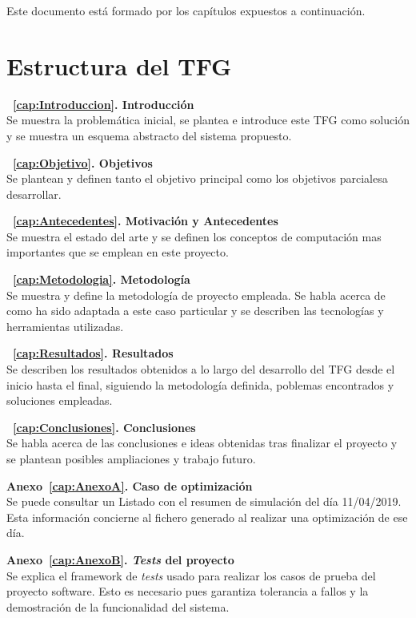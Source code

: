 Este documento está formado por los capítulos expuestos a continuación.

\section{Estructura del TFG}
\begin{description}
\item \textbf{~\ref{cap:Introduccion}. Introducción}\\
  Se muestra la problemática inicial, se plantea e introduce este \gls{TFG} como solución y se muestra un esquema abstracto del sistema propuesto.
\item \textbf{~\ref{cap:Objetivo}. Objetivos}\\
  Se plantean y definen tanto el objetivo principal como los objetivos parcialesa desarrollar.
\item \textbf{~\ref{cap:Antecedentes}. Motivación y Antecedentes}\\
  Se muestra el estado del arte y se definen los conceptos de computación mas importantes que se emplean en este proyecto.
\item \textbf{~\ref{cap:Metodologia}. Metodología}\\
  Se muestra y define la metodología de proyecto empleada. Se habla acerca de como ha sido adaptada a este caso particular y se describen las tecnologías y herramientas utilizadas.
\item \textbf{~\ref{cap:Resultados}. Resultados}\\
  Se describen los resultados obtenidos a lo largo del desarrollo del \gls{TFG} desde el inicio hasta el final, siguiendo la metodología definida, poblemas encontrados y soluciones empleadas.
\item \textbf{~\ref{cap:Conclusiones}. Conclusiones}\\
  Se habla acerca de las conclusiones e ideas obtenidas tras finalizar el proyecto y se plantean posibles ampliaciones y trabajo futuro.
\item \textbf{Anexo~\ref{cap:AnexoA}. Caso de optimización}\\
  Se puede consultar un Listado con el resumen de simulación del día 11/04/2019. Esta información concierne al fichero generado al realizar una optimización de ese día.
\item \textbf{Anexo~\ref{cap:AnexoB}. \textit{Tests} del proyecto}\\
  Se explica el framework de \textit{tests} usado para realizar los casos de prueba del proyecto software. Esto es necesario pues garantiza tolerancia a fallos y la demostración de la funcionalidad del sistema.
\end{description}
